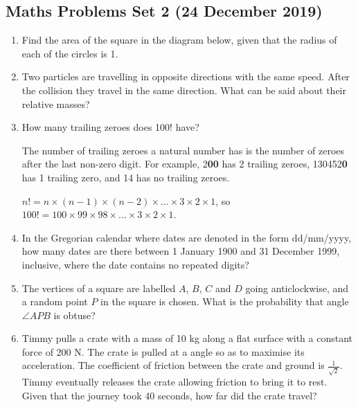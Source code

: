 \documentclass[a4paper]{article}
\begin{document}
\begin{center}
    \section*{Maths Problems Set 2 (24 December 2019)}
\end{center}

\begin{enumerate}
    \item
    Find the area of the square in the diagram below, given that the radius of each of the circles is 1.
    

    \item
    Two particles are travelling in opposite directions with the same speed. After the collision they travel in the same direction. What can be said about their relative masses?
    
    \item
    How many trailing zeroes does 100! have?
    
    The number of trailing zeroes a natural number has is the number of zeroes after the last non-zero digit. For example, 2\textbf{00} has 2 trailing zeroes, 130452\textbf{0} has 1 trailing zero, and 14 has no trailing zeroes.
    
    $n! = n \times (n - 1) \times (n - 2) \times ... \times 3 \times 2 \times 1$, so $100! = 100 \times 99 \times 98 \times ... \times 3 \times 2 \times 1$.
    
    \item
    In the Gregorian calendar where dates are denoted in the form dd/mm/yyyy, how many dates are there between 1 January 1900 and 31 December 1999, inclusive, where the date contains no repeated digits?
    
    \item
    The vertices of a square are labelled $A$, $B$, $C$ and $D$ going anticlockwise, and a random point $P$ in the square is chosen. What is the probability that angle $\angle{APB}$ is obtuse?
    
    \item
    Timmy pulls a crate with a mass of 10 kg along a flat surface with a constant force of 200 N. The crate is pulled at a angle so as to maximise its acceleration. The coefficient of friction between the crate and ground is $\frac{1}{\sqrt{2}}$. Timmy eventually releases the crate allowing friction to bring it to rest. Given that the journey took 40 seconds, how far did the crate travel?
    

\end{enumerate}
\end{document}
